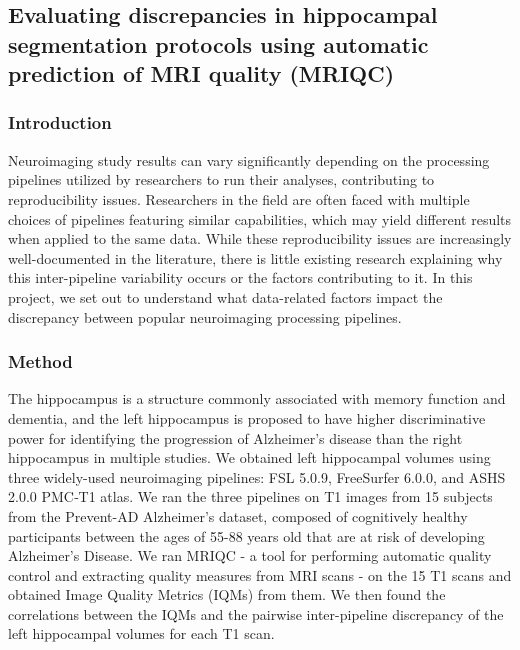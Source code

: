 \documentclass[../main.tex]{subfiles}
\begin{document}
\subsection{Evaluating discrepancies in hippocampal segmentation protocols using automatic prediction of MRI quality (MRIQC)}\label{sec:HyppoMRIQC}


\subsubsection{Introduction}

Neuroimaging study results can vary significantly depending on the processing pipelines utilized by researchers to run their analyses, contributing to reproducibility issues. Researchers in the field are often faced with multiple choices of pipelines featuring similar capabilities, which may yield different results when applied to the same data\supercite{carp2012plurality, kennedy2019everything}. While these reproducibility issues are increasingly well-documented in the literature, there is little existing research explaining why this inter-pipeline variability occurs or the factors contributing to it. In this project, we set out to understand what data-related factors impact the discrepancy between popular neuroimaging processing pipelines.

\subsubsection{Method}

The hippocampus is a structure commonly associated with memory function and dementia, and the left hippocampus is proposed to have higher discriminative power for identifying the progression of Alzheimer’s disease than the right hippocampus in multiple studies\supercite{schuff2009mri}. We obtained left hippocampal volumes using three widely-used neuroimaging pipelines: FSL 5.0.9\supercite{patenaude2011bayesian}, FreeSurfer 6.0.0\supercite{fischl2012freesurfer}, and ASHS 2.0.0 PMC‐T1 atlas\supercite{xie2019automated}.
We ran the three pipelines on T1 images from 15 subjects from the Prevent-AD Alzheimer’s dataset\supercite{tremblay2021open}, composed of cognitively healthy participants between the ages of 55-88 years old that are at risk of developing Alzheimer's Disease. 
We ran MRIQC\supercite{esteban2017mriqc} - a tool for performing automatic quality control and extracting quality measures from MRI scans - on the 15 T1 scans and obtained Image Quality Metrics (IQMs) from them. We then found the correlations between the IQMs and the pairwise inter-pipeline discrepancy of the left hippocampal volumes for each T1 scan.
\end{document}
